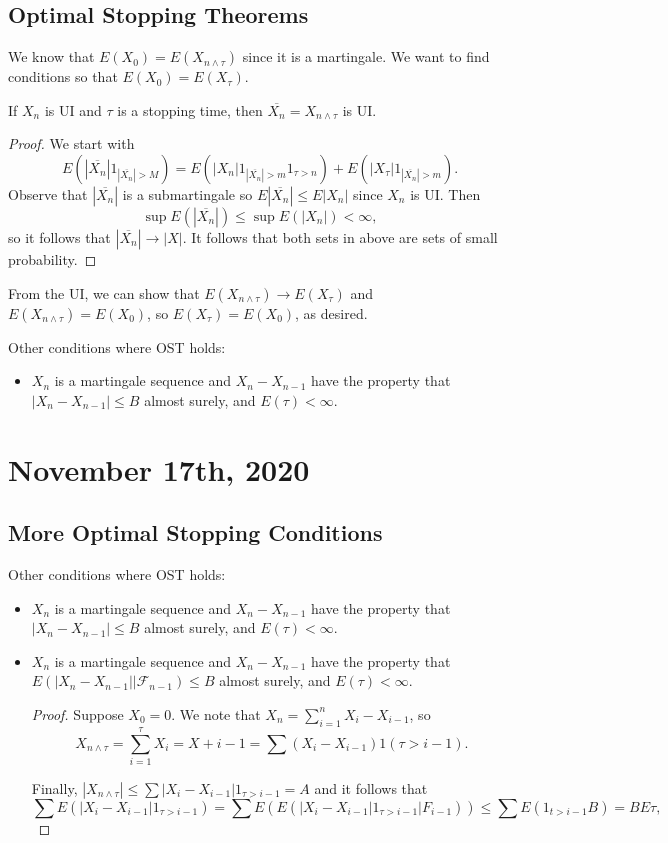 \documentclass[11pt]{scrartcl}
\let \mc \mathcal
\begin{document}
\subsection{Optimal Stopping Theorems}
We know that $E(X_0) = E(X_{n \wedge \tau})$ since it is a martingale.  We want to find conditions so that $E(X_0) = E(X_\tau)$.
\begin{lemma} If $X_n$ is UI and $\tau$ is a stopping time, then $\overline{X_n} = X_{n \wedge \tau}$ is UI.
\end{lemma}
\begin{proof}
We start with 
$$E(|\overline{X_n}|1_{|\overline{X_n}| > M}) = E(|X_n|1_{|\overline{X_n}| > m}1_{\tau > n}) + E(|X_\tau|1_{|\overline{X_n}| > m}).$$
Observe that $|\overline{X_{n}}|$ is a submartingale so $E|\overline{X_n}| \le E|X_n|$ since $X_n$ is UI.  Then 
$$\sup E(|\overline{X_n}|) \le \sup E(|X_n|) < \infty,$$
so it follows that $|\overline{X_n}| \to |X|$.  It follows that both sets in above are sets of small probability.
\end{proof}

From the UI, we can show that $E(X_{n \wedge \tau}) \to E(X_\tau)$ and $E(X_{n \wedge \tau}) = E(X_0)$, so $E(X_\tau) = E(X_0)$, as desired.

Other conditions where OST holds:
\begin{itemize}
\item $X_n$ is a martingale sequence and $X_n - X_{n-1}$ have the property that $|X_n - X_{n-1}| \le B$ almost surely, and $E(\tau) < \infty$.  
\end{itemize}
\pagebreak
\section{November 17th, 2020}
\subsection{More Optimal Stopping Conditions}

Other conditions where OST holds:
\begin{itemize}
\item $X_n$ is a martingale sequence and $X_n - X_{n-1}$ have the property that $|X_n - X_{n-1}| \le B$ almost surely, and $E(\tau) < \infty$.  
\item $X_n$ is a martingale sequence and $X_n - X_{n-1}$ have the property that $E(|X_n - X_{n-1}| |\mc F_{n-1}) \le B$ almost surely, and $E(\tau) < \infty$.  
\begin{proof}
Suppose $X_0 = 0$. We note that $X_n = \sum_{i=1}^n X_i - X_{i-1}$, so $$X_{n \wedge \tau} = \sum_{i=1}^\tau X_{i} = X+{i-1} = \sum (X_i - X_{i-1}) 1(\tau > i-1).$$

Finally, $|X_{n \wedge \tau}| \le \sum |X_i - X_{i-1}|1_{\tau >i -1} = A$ and it follows that 
$$\sum E(|X_i - X_{i-1}|1_{\tau > i-1}) = \sum E(E(|X_i - X_{i-1}|1_{\tau > i-1}|F_{i-1})) \le \sum E(1_{t > i-1} B) = BE\tau,$$
\end{proof}
\end{itemize}
\end{document}
